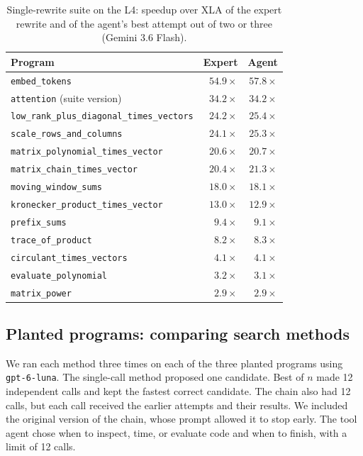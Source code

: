 \documentclass[conference]{IEEEtran}
\begin{document}
\begin{table}[t]
  \centering
  \caption{Single-rewrite suite on the L4: speedup over XLA of the expert
  rewrite and of the agent's best attempt out of two or three (Gemini 3.6
  Flash).}
  \label{tab:suite}
  \begin{tabular}{@{}lrr@{}}
    \toprule
    Program & Expert & Agent \\
    \midrule
    \texttt{embed\_tokens} & $54.9\times$ & $57.8\times$ \\
    \texttt{attention} (suite version) & $34.2\times$ & $34.2\times$ \\
    \texttt{low\_rank\_plus\_diagonal\_times\_vectors} & $24.2\times$ & $25.4\times$ \\
    \texttt{scale\_rows\_and\_columns} & $24.1\times$ & $25.3\times$ \\
    \texttt{matrix\_polynomial\_times\_vector} & $20.6\times$ & $20.7\times$ \\
    \texttt{matrix\_chain\_times\_vector} & $20.4\times$ & $21.3\times$ \\
    \texttt{moving\_window\_sums} & $18.0\times$ & $18.1\times$ \\
    \texttt{kronecker\_product\_times\_vector} & $13.0\times$ & $12.9\times$ \\
    \texttt{prefix\_sums} & $9.4\times$ & $9.1\times$ \\
    \texttt{trace\_of\_product} & $8.2\times$ & $8.3\times$ \\
    \texttt{circulant\_times\_vectors} & $4.1\times$ & $4.1\times$ \\
    \texttt{evaluate\_polynomial} & $3.2\times$ & $3.1\times$ \\
    \texttt{matrix\_power} & $2.9\times$ & $2.9\times$ \\
    \bottomrule
  \end{tabular}
\end{table}

\subsection{Planted programs: comparing search methods}

We ran each method three times on each of the three planted programs
using \texttt{gpt-6-luna}. The single-call method proposed one candidate.
Best of $n$ made 12 independent calls and kept the fastest correct
candidate. The chain also had 12 calls, but each call received the
earlier attempts and their results. We included the original version of
the chain, whose prompt allowed it to stop early. The tool agent chose
when to inspect, time, or evaluate code and when to finish, with a limit
of 12 calls.
\end{document}
